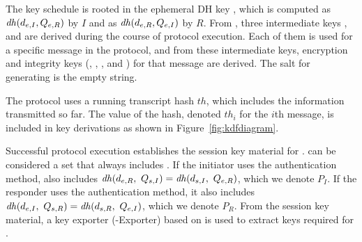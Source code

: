 The key schedule is rooted in the ephemeral DH key
\mGxy{}, which is computed as $\mathit{dh}(d_{e,I}, Q_{e,R})$ by $I$ and as $\mathit{dh}(d_{e,R}, Q_{e,I})$
by $R$.
%
From \mGxy{}, three intermediate keys \mPRKtwo, \mPRKthree{} and
\mPRKfour{} are derived during the course of protocol execution.
%
Each of them is used for a specific message in the protocol, and from
these intermediate keys, encryption and integrity keys
(\mKtwoe, \mKtwom{}, \mKthreeae, and \mKthreem) for that message are derived.
%
The salt for generating \mPRKtwo{} is the empty string.
%

The protocol uses a running transcript hash $th$, which includes the information
transmitted so far.
%
The value of the hash, denoted $th_i$ for the $i$th message, is included in key
derivations as shown in Figure~\ref{fig:kdfdiagram}.
%

%

Successful protocol execution establishes the session key material \mSessKey{}
for \mOscore{}.
%
\mSessKey{} can be considered a set that always includes \mGxy{}.
%
If the initiator uses the \mStat{} authentication method, \mSessKey{} also
includes
$\mDH(\mY,\ \mGi{}) = \mDH(\mPriv{I},\ \mGy)$, which we denote $P_I$.
%
If the responder uses the \mStat{} authentication method, it also includes
$\mDH(\mX,\ \mGr{}) = \mDH(\mPriv{R},\ \mGx)$, which we denote $P_R$.
%
From the session key material, a key exporter (\mEdhoc-Exporter) based on
\mHkdf{} is used to extract keys required for \mOscore{}.
%
%

\begin{figure*}[!h]
\centering
\scalebox{.785}{

}
\caption{Key schedule: Light blue boxes hold DH keys ($P_e, P_I, P_R$),
orange boxes intermediate key material (\mPRKtwo, \mPRKthree, \mPRKfour), and
dark blue boxes keys for \mAead{} or \mXor{} encryption
(\mKtwoe, \mKtwom, \mKthreeae, \mKthreem).
Dashed boxes are conditionals.}
\label{fig:kdfdiagram}
\end{figure*}

